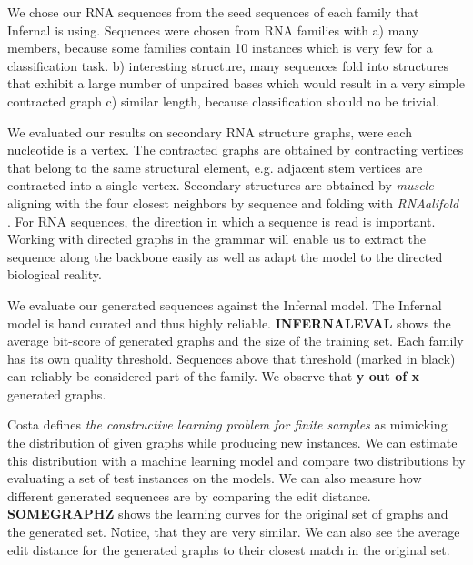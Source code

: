 \documentclass{article}
\begin{document}
We chose our RNA sequences from the seed sequences of each family
that Infernal is using\cite{rfam}. Sequences were chosen from RNA families with
a) many members, because some families contain 10
instances which is very few for a classification task. b) interesting 
structure, many sequences fold into structures that exhibit a large number of 
unpaired bases which would result in a very simple contracted graph
c) similar length, because classification should no be trivial.

We evaluated our results on secondary RNA structure graphs, were each 
nucleotide is a vertex. The contracted graphs are obtained by 
contracting vertices that belong to the same structural element,
e.g. adjacent stem vertices are contracted into a single vertex.
Secondary structures are obtained by \emph{muscle}-aligning \cite{muscle} with 
the four closest neighbors by sequence and folding with \emph{RNAalifold}
\cite{rnaalifold}.  For RNA sequences, the direction in which a sequence
is read is important.  Working with directed graphs in the grammar
will enable us to extract the sequence along the backbone easily as well
as adapt the model to the directed biological reality.

We evaluate our generated sequences against the Infernal model.
The Infernal model is hand curated and thus highly reliable.
 \textbf{INFERNALEVAL} shows the average bit-score of generated graphs
and the size of the training set. Each family has its own quality threshold.
Sequences above that threshold (marked in black) can reliably be considered
part of the family. We observe that \textbf{y out of x} generated graphs.

Costa \cite{costa14} defines \emph{the constructive learning problem for 
finite samples} 
as mimicking the distribution of given graphs while producing new instances.
We can estimate this distribution with a machine learning
model and compare two distributions by evaluating a set of test instances
on the models. We can also measure how different generated sequences
are by comparing the edit distance.
\textbf{SOMEGRAPHZ} shows the learning curves for the original set
of graphs and the generated set. Notice, that they are very similar.
We can also see the average edit distance for the generated graphs 
to their closest match in the original set.
\end{document}

